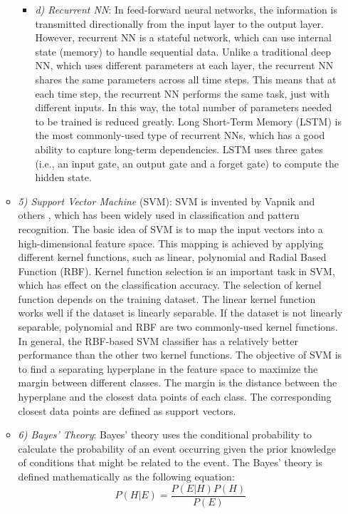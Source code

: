 \begin{itemize}
\begin{itemize}
\begin{itemize}
\item[]\textit{d)	Recurrent NN}: In feed-forward neural networks, the information is transmitted directionally from the input layer to the output layer. However, recurrent NN is a stateful network, which can use internal state (memory) to handle sequential data. Unlike a traditional deep NN, which uses different parameters at each layer, the recurrent NN shares the same parameters across all time steps. This means that at each time step, the recurrent NN performs the same task, just with different inputs. In this way, the total number of parameters needed to be trained is reduced greatly. Long Short-Term Memory (LSTM) \cite{Li2015a} is the most commonly-used type of recurrent NNs, which has a good ability to capture long-term dependencies. LSTM uses three gates (i.e., an input gate, an output gate and a forget gate) to compute the hidden state.
\end{itemize}
\item[]\textit{5) Support Vector Machine} (SVM): SVM is invented by Vapnik and others \cite{Vapnik1999}, which has been widely used in classification and pattern recognition. The basic idea of SVM is to map the input vectors into a high-dimensional feature space. This mapping is achieved by applying different kernel functions, such as linear, polynomial and Radial Based Function (RBF). Kernel function selection is an important task in SVM, which has effect on the classification accuracy. The selection of kernel function depends on the training dataset. The linear kernel function works well if the dataset is linearly separable. If the dataset is not linearly separable, polynomial and RBF are two commonly-used kernel functions. In general, the RBF-based SVM classifier has a relatively better performance than the other two kernel functions.
The objective of SVM is to find a separating hyperplane in the feature space to maximize the margin between different classes. The margin is the distance between the hyperplane and the closest data points of each class. The corresponding closest data points are defined as support vectors.
\item[]\textit{6) Bayes’ Theory}: Bayes’ theory uses the conditional probability to calculate the probability of an event occurring given the prior knowledge of conditions that might be related to the event. The Bayes’ theory is defined mathematically as the following equation:
\begin{equation*}
P(H\vert E)=\dfrac{P(E\vert H)P(H)}{P(E)}
\end{equation*}

\end{itemize}
\end{itemize}
